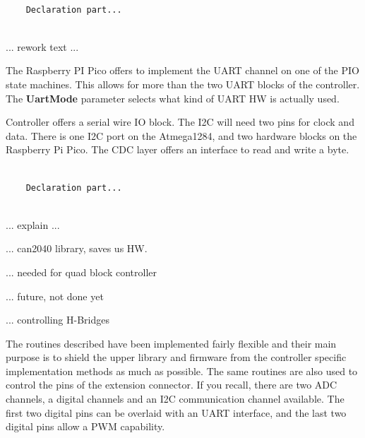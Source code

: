 \lstset{language=c++, style=codesnippetstyle}
\begin{lstlisting}
   
    Declaration part...
    
\end{lstlisting}
\FloatBarrier

... rework text ... 

The Raspberry PI Pico offers to implement the UART channel on one of the PIO state machines. This allows for more than the two UART blocks of the controller. The \textbf{UartMode} parameter selects what kind of UART HW is actually used.


Controller offers a serial wire IO block. The I2C will need two pins for clock and data. There is one I2C port on the Atmega1284, and two hardware blocks on the Raspberry Pi Pico. The CDC layer offers an interface to read and write a byte.

\lstset{language=c++, style=codesnippetstyle}
\begin{lstlisting}
   
    Declaration part...
    
\end{lstlisting}
\FloatBarrier


... explain ...


... can2040 library, saves us HW.


... needed for quad block controller


... future, not done yet 


... controlling H-Bridges


The routines described have been implemented fairly flexible and their main purpose is to shield the upper library and firmware from the controller specific implementation methods as much as possible. The same routines are also used to control the pins of the extension connector. If you recall, there are two ADC channels, a digital channels and an I2C communication channel available. The first two digital pins can be overlaid with an UART interface, and the last two digital pins allow a PWM capability.

